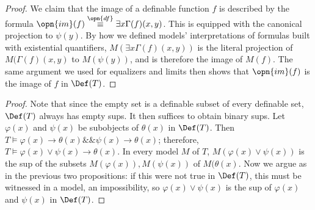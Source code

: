 \documentclass[11pt]{article}
\begin{document}

\begin{proof}
We claim that the image of a definable function $f$ is described by the formula $\opn{im}(f) \overset{\opn{df}}{\equiv} \exists x \Gamma(f)(x,y)$. This is equipped with the canonical projection to $\psi(y)$. By how we defined models' interpretations of formulas built with existential quantifiers, $M(\exists x \Gamma(f)(x,y))$ is the literal projection of $M(\Gamma(f)(x,y)$ to $M(\psi(y))$, and is therefore the image of $M(f)$. The same argument we used for equalizers and limits then shows that $\opn{im}(f)$ is the image of $f$ in $\Def(T)$.
\end{proof}



\begin{proof}
Note that since the empty set is a definable subset of every definable set, $\Def(T)$ always has empty sups. It then suffices to obtain binary sups. Let $\varphi(x)$ and $\psi(x)$ be subobjects of $\theta(x)$ in $\Def(T)$. Then $T \models \varphi(x) \rightarrow \theta(x) \&\& \psi(x) \rightarrow \theta(x)$; therefore, $T \models \varphi(x) \lor \psi(x) \rightarrow \theta(x)$. In every model $M$ of $T$, $M(\varphi(x) \lor \psi(x))$ is the sup of the subsets $M(\varphi(x)), M(\psi(x))$ of $M(\theta(x)$. Now we argue as in the previous two propositions: if this were not true in $\Def(T)$, this must be witnessed in a model, an impossibility, so $\varphi(x) \lor \psi(x)$ is the sup of $\varphi(x)$ and $\psi(x)$ in $\Def(T)$.
\end{proof}
\end{document}
